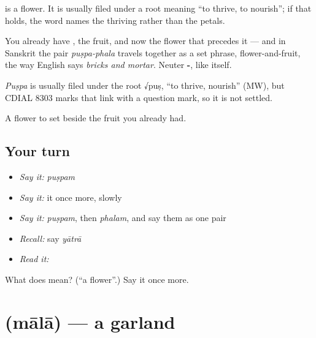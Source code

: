 \textbf{} is a flower. It is usually filed under a root meaning \textquotedblleft{}to thrive, to nourish\textquotedblright{}; if that holds, the word names the thriving rather than the petals.

You already have \textbf{}, the fruit, and now the flower that precedes it — and in Sanskrit the pair \emph{puṣpa-phala} travels together as a set phrase, flower-and-fruit, the way English says \emph{bricks and mortar}. Neuter \textbf{-}, like  itself.

\begin{cousinweb}
\emph{Puṣpa} is usually filed under the root √puṣ, \textquotedblleft{}to thrive, nourish\textquotedblright{} (MW), but CDIAL 8303 marks that link with a question mark, so it is not settled.
\end{cousinweb}

\begin{grammarlens}[title={What you've built}]
A flower to set beside the fruit you already had.
\end{grammarlens}

\subsection*{Your turn}
\begin{itemize}
\raggedright
  \item \emph{Say it:} \emph{puṣpam}
  \item \emph{Say it:} it once more, slowly
  \item \emph{Say it:} \emph{puṣpam}, then \emph{phalam}, and say them as one pair
  \item \emph{Recall:} say \emph{yātrā}
  \item \emph{Read it:} \textbf{}
\end{itemize}

\begin{tcolorbox}[breakable,colback=teal!4,colframe=teal!35!black,title={Before you move on}]
What does  mean? (\textquotedblleft{}a flower\textquotedblright{}.) Say it once more.
\end{tcolorbox}
\section[\texorpdfstring{\sk{माला} (mālā)}{माला (mālā)}]{ (mālā) — a garland}

\label{lesson:SA-C30-garland}



